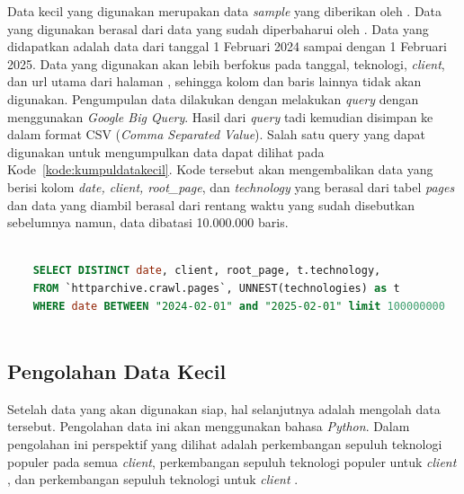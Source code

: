 Data kecil yang digunakan merupakan data \textit{sample} yang diberikan oleh \http. Data yang digunakan berasal dari data yang sudah diperbaharui oleh \http. Data yang didapatkan adalah data dari tanggal 1 Februari 2024 sampai dengan 1 Februari 2025. Data yang digunakan akan lebih berfokus pada tanggal, teknologi, \textit{client}, dan url utama dari halaman \web, sehingga kolom dan baris lainnya tidak akan digunakan. Pengumpulan data dilakukan dengan melakukan \textit{query} dengan menggunakan \textit{Google Big Query}. Hasil dari \textit{query} tadi kemudian disimpan ke dalam format CSV (\textit{Comma Separated Value}). Salah satu query yang dapat digunakan untuk mengumpulkan data dapat dilihat pada Kode~\ref{kode:kumpuldatakecil}. Kode tersebut akan mengembalikan data yang berisi kolom \textit{date, client, root\_page}, dan \textit{technology} yang berasal dari tabel \textit{pages} dan data yang diambil berasal dari rentang waktu yang sudah disebutkan sebelumnya namun, data dibatasi 10.000.000 baris.

\begin{lstlisting}[language=SQL, caption=Kode untuk mengumpulkan data kecil, label=kode:kumpuldatakecil]

    SELECT DISTINCT date, client, root_page, t.technology,  
    FROM `httparchive.crawl.pages`, UNNEST(technologies) as t 
    WHERE date BETWEEN "2024-02-01" and "2025-02-01" limit 100000000
    
\end{lstlisting}

\subsection{Pengolahan Data Kecil}
\label{subsec:pengolahankecil}

Setelah data yang akan digunakan siap, hal selanjutnya adalah mengolah data tersebut. Pengolahan data ini akan menggunakan bahasa \textit{Python}. Dalam pengolahan ini perspektif yang dilihat adalah perkembangan sepuluh teknologi populer pada semua \textit{client}, perkembangan sepuluh teknologi populer untuk \textit{client} \mobile, dan perkembangan sepuluh teknologi untuk \textit{client} \desktop.

